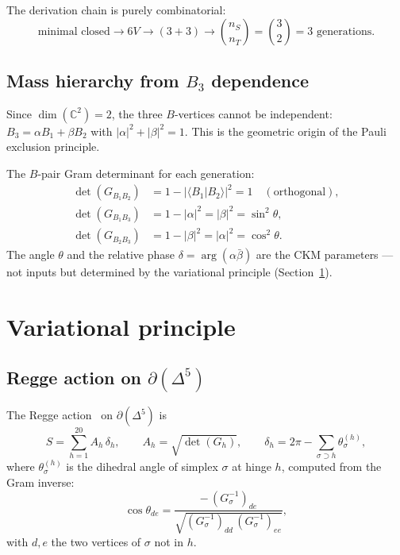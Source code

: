 \documentclass[12pt,a4paper]{article}
\newcommand{\CC}{\mathbb{C}}
\newcommand{\nS}{n_S}
\newcommand{\nT}{n_T}
\begin{document}
The derivation chain is purely combinatorial:
\begin{equation}
\text{minimal closed} \to 6V \to (3{+}3)
\to \binom{\nS}{\nT} = \binom{3}{2} = 3 \text{ generations.}
\end{equation}

\subsection{Mass hierarchy from $B_3$ dependence}

Since $\dim(\CC^2) = 2$, the three $B$-vertices cannot be
independent: $B_3 = \alpha B_1 + \beta B_2$ with
$|\alpha|^2 + |\beta|^2 = 1$.  This is the geometric origin
of the Pauli exclusion principle.

The $B$-pair Gram determinant for each generation:
\begin{align}
\det(G_{B_1B_2}) &= 1 - |\langle B_1|B_2\rangle|^2 = 1
\quad (\text{orthogonal}), \label{eq:det12} \\
\det(G_{B_1B_3}) &= 1 - |\alpha|^2 = |\beta|^2 = \sin^2\theta,
\label{eq:det13} \\
\det(G_{B_2B_3}) &= 1 - |\beta|^2 = |\alpha|^2 = \cos^2\theta.
\label{eq:det23}
\end{align}
The angle $\theta$ and the relative phase
$\delta = \arg(\alpha\bar\beta)$ are the CKM parameters ---
not inputs but determined by the variational principle
(Section~\ref{sec:variational}).

\section{Variational principle}
\label{sec:variational}

\subsection{Regge action on $\partial(\Delta^5)$}

The Regge action~\cite{regge1961} on $\partial(\Delta^5)$ is
\begin{equation}
\label{eq:regge}
S = \sum_{h=1}^{20} A_h\,\delta_h,
\qquad A_h = \sqrt{\det(G_h)},
\qquad \delta_h = 2\pi - \sum_{\sigma \supset h} \theta_\sigma^{(h)},
\end{equation}
where $\theta_\sigma^{(h)}$ is the dihedral angle of simplex
$\sigma$ at hinge $h$, computed from the Gram inverse:
\begin{equation}
\cos\theta_{de} = \frac{-\,(G_\sigma^{-1})_{de}}
{\sqrt{(G_\sigma^{-1})_{dd}\,(G_\sigma^{-1})_{ee}}},
\end{equation}
with $d,e$ the two vertices of $\sigma$ not in $h$.
\end{document}
